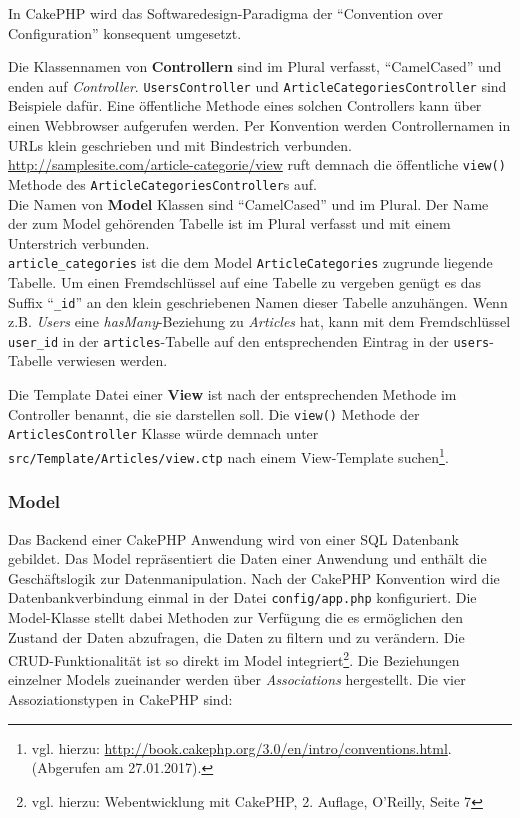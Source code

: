 	In CakePHP wird das Softwaredesign-Paradigma der \enquote{Convention over Configuration} konsequent umgesetzt.\newline %
	
	 Die Klassennamen von \textbf{Controllern} sind im Plural verfasst, \enquote{CamelCased} und enden auf \textit{Controller}. \texttt{UsersController} und \texttt{ArticleCategoriesController} sind Beispiele dafür. Eine öffentliche Methode eines solchen Controllers kann über einen Webbrowser aufgerufen werden. Per Konvention werden Controllernamen in URLs klein geschrieben und mit Bindestrich verbunden.
	\url{http://samplesite.com/article-categorie/view} ruft demnach die öffentliche \texttt{view()} Methode des \texttt{ArticleCategoriesController}s auf.\\
	\newline
	Die Namen von \textbf{Model} Klassen sind \enquote{CamelCased} und im Plural. Der Name der zum Model gehörenden Tabelle ist im Plural verfasst und mit einem Unterstrich verbunden.\\
	\texttt{article\_categories} ist die dem Model \texttt{ArticleCategories} zugrunde liegende Tabelle. Um einen Fremdschlüssel auf eine Tabelle zu vergeben genügt es das Suffix \enquote{\texttt{\_id}} an den klein geschriebenen Namen dieser Tabelle anzuhängen. Wenn z.B. \textit{Users} eine \textit{hasMany}-Beziehung zu \textit{Articles} hat, kann mit dem Fremdschlüssel \texttt{user\_id} in der \texttt{articles}-Tabelle auf den entsprechenden Eintrag in der \texttt{users}-Tabelle verwiesen werden. \newline
	
	Die Template Datei einer \textbf{View} ist nach der entsprechenden Methode im Controller benannt, die sie darstellen soll. Die \texttt{view()} Methode der \texttt{ArticlesController} Klasse würde demnach unter \texttt{src/Template/Articles/view.ctp} nach einem View-Template suchen\footnote{vgl. hierzu: \url{http://book.cakephp.org/3.0/en/intro/conventions.html}.(Abgerufen am 27.01.2017).}. 
	
	\subsubsection{Model}
	
	Das Backend einer CakePHP Anwendung wird von einer SQL Datenbank gebildet. Das Model repräsentiert die Daten einer Anwendung und enthält die Geschäftslogik zur Datenmanipulation. Nach der CakePHP Konvention wird die Datenbankverbindung einmal in der Datei \texttt{config/app.php} konfiguriert. Die Model-Klasse stellt dabei Methoden zur Verfügung die es ermöglichen den Zustand der Daten abzufragen, die Daten zu filtern und zu verändern. Die CRUD-Funktionalität ist so direkt im Model integriert\footnote{vgl. hierzu: Webentwicklung mit CakePHP, 2. Auflage, O'Reilly, Seite 7}. 
	Die Beziehungen einzelner Models zueinander werden über \textit{Associations} hergestellt. Die vier Assoziationstypen in CakePHP sind:\\

